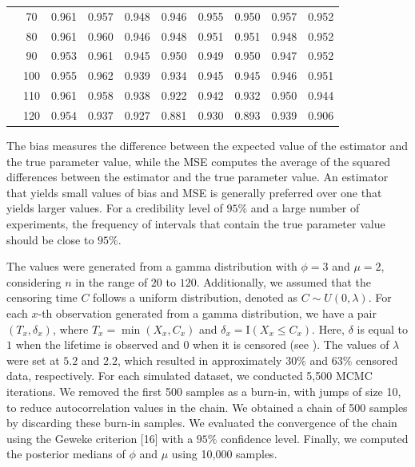 \begin{table}[!h]
\begin{tabular}{c|c|c|c|c|c|c|c|c|c}
&  70 & 0.961 & 0.957 & 0.948 & 0.946 & 0.955 & 0.950 & 0.957 & 0.952 \\
&  80 & 0.961 & 0.960 & 0.946 & 0.948 & 0.951 & 0.951 & 0.948 & 0.952 \\
&  90 & 0.953 & 0.961 & 0.945 & 0.950 & 0.949 & 0.950 & 0.947 & 0.952 \\
&  100 & 0.955 & 0.962 & 0.939 & 0.934 & 0.945 & 0.945 & 0.946 & 0.951 \\
&  110 & 0.961 & 0.958 & 0.938 & 0.922 & 0.942 & 0.932 & 0.950 & 0.944 \\
&  120 & 0.954 & 0.937 & 0.927 & 0.881 & 0.930 & 0.893 & 0.939 & 0.906 \\ \hline
\hline
\end{tabular}
\label{tableres2}
\end{table}

The bias measures the difference between the expected value of the estimator and the true parameter value, while the MSE computes the average of the squared differences between the estimator and the true parameter value. An estimator that yields small values of bias and MSE is generally preferred over one that yields larger values. %
For a credibility level of $95\%$ and a large number of experiments, the frequency of intervals that contain the true parameter value should be close to $95\%$. 

The values were generated from a gamma distribution with $\phi=3$ and $\mu=2$, considering $n$ in the range of $20$ to $120$. Additionally, we assumed that the censoring time $C$ follows a uniform distribution, denoted as $C \sim U(0,\lambda)$. For each $x$-th observation generated from a gamma distribution, we have a pair $(T_x, \delta_x)$, where $T_x = \min (X_x, C_x)$ and $\delta_x = \mathrm{I}(X_x \leq C_x)$. Here, $\delta$ is equal to $1$ when the lifetime is observed and $0$ when it is censored (see \cite{ramos2020sampling}). The values of $\lambda$ were set at $5.2$ and $2.2$, which resulted in approximately $30\%$ and $63\%$ censored data, respectively. For each simulated dataset, we conducted 5,500 MCMC iterations. We removed the first 500 samples as a burn-in, with jumps of size 10, to reduce autocorrelation values in the chain. We obtained a chain of 500 samples by discarding these burn-in samples. We evaluated the convergence of the chain using the Geweke criterion [16] with a $95\%$ confidence level. Finally, we computed the posterior medians of $\phi$ and $\mu $ using 10,000 samples.



